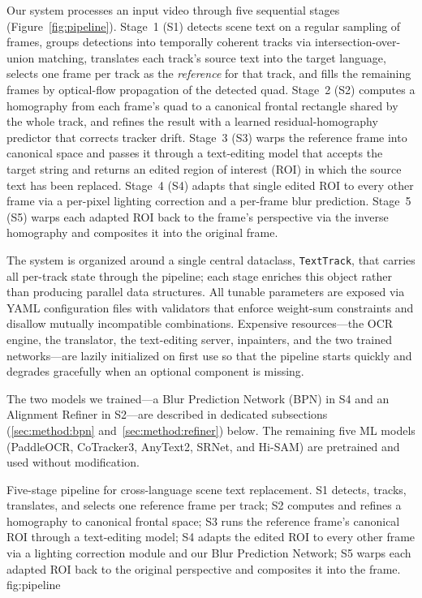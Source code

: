 Our system processes an input video through five sequential stages
(Figure~\ref{fig:pipeline}). Stage~1 (S1) detects scene text on a
regular sampling of frames, groups detections into temporally
coherent tracks via intersection-over-union matching, translates
each track's source text into the target language, selects one
frame per track as the \emph{reference} for that track, and fills
the remaining frames by optical-flow propagation of the detected
quad. Stage~2 (S2) computes a homography from each frame's quad to a
canonical frontal rectangle shared by the whole track, and refines
the result with a learned residual-homography predictor that
corrects tracker drift. Stage~3 (S3) warps the reference frame into
canonical space and passes it through a text-editing model that
accepts the target string and returns an edited region of interest
(ROI) in which the source text has been replaced. Stage~4 (S4)
adapts that single edited ROI to every other frame via a per-pixel
lighting correction and a per-frame blur prediction. Stage~5 (S5)
warps each adapted ROI back to the frame's perspective via the
inverse homography and composites it into the original frame.

The system is organized around a single central dataclass,
\texttt{TextTrack}, that carries all per-track state through the
pipeline; each stage enriches this object rather than producing
parallel data structures. All tunable parameters are exposed via
YAML configuration files with validators that enforce weight-sum
constraints and disallow mutually incompatible combinations.
Expensive resources---the OCR engine, the translator, the
text-editing server, inpainters, and the two trained networks---are
lazily initialized on first use so that the pipeline starts quickly
and degrades gracefully when an optional component is missing.

The two models we trained---a Blur Prediction Network (BPN) in S4
and an Alignment Refiner in S2---are described in dedicated
subsections (\ref{sec:method:bpn} and~\ref{sec:method:refiner})
below. The remaining five ML models (PaddleOCR, CoTracker3,
AnyText2, SRNet, and Hi-SAM) are pretrained and used without
modification.

%
  {Five-stage pipeline for cross-language scene text replacement.
   S1 detects, tracks, translates, and selects one reference frame
   per track; S2 computes and refines a homography to canonical
   frontal space; S3 runs the reference frame's canonical ROI
   through a text-editing model; S4 adapts the edited ROI to every
   other frame via a lighting correction module and our Blur
   Prediction Network; S5 warps each adapted ROI back to the
   original perspective and composites it into the frame.}%
  {fig:pipeline}

